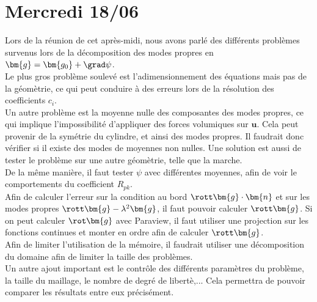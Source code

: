 \section{Mercredi 18/06}

Lors de la réunion de cet après-midi, nous avons parlé des différents problèmes survenus lors de la décomposition des modes propres en $\bm{g}=\bm{g_0}+\grad\psi$.\\
Le plus gros problème soulevé est l'adimensionnement des équations mais pas de la géomètrie, ce qui peut conduire à des erreurs lors de la résolution des coefficients $c_i$.\\
Un autre problème est la moyenne nulle des composantes des modes propres, ce qui implique l'impossibilité d'appliquer des forces volumiques sur $\bm{u}$. Cela peut provenir de la symétrie du cylindre, et ainsi des modes propres. Il faudrait donc vérifier si il existe des modes de moyennes non nulles. Une solution est aussi de tester le problème sur une autre géomètrie, telle que la marche.\\
De la même manière, il faut tester $\psi$ avec différentes moyennes, afin de voir le comportements du coefficient $R_{pk}$.\\

Afin de calculer l'erreur sur la condition au bord $\rott\bm{g}\cdot\bm{n}$ et sur les modes propres $\rott\bm{g}-\lambda^2\bm{g}$, il faut pouvoir calculer $\rott\bm{g}$. Si on peut calculer $\rot\bm{g}$ avec Paraview, il faut utiliser une projection sur les fonctions continues et monter en ordre afin de calculer $\rott\bm{g}$.\\
Afin de limiter l'utilisation de la mémoire, il faudrait utiliser une décomposition du domaine afin de limiter la taille des problèmes.\\

Un autre ajout important est le contrôle des différents paramètres du problème, la taille du maillage, le nombre de degré de libertè,... Cela permettra de pouvoir comparer les résultats entre eux précisément.

